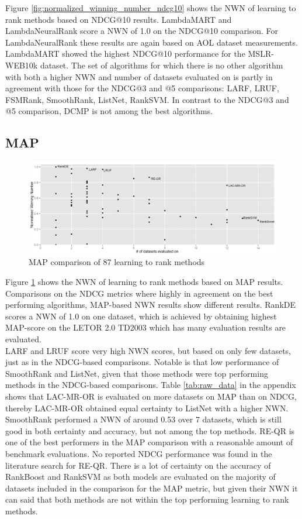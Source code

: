 \documentclass[english, authoryear, preprint]{elsarticle}
\begin{document}
Figure \ref{fig:normalized_winning_number_ndcg10} shows the NWN of learning to rank methods based on NDCG@10 results. LambdaMART and LambdaNeuralRank score a NWN of 1.0 on the NDCG@10 comparison. For LambdaNeuralRank these results are again based on AOL dataset measurements. LambdaMART showed the highest NDCG@10 performance for the MSLR-WEB10k dataset. The set of algorithms for which there is no other algorithm with both a higher NWN and number of datasets evaluated on is partly in agreement with those for the NDCG@3 and @5 comparisons: {LARF, LRUF, FSMRank, SmoothRank, ListNet, RankSVM}. In contrast to the NDCG@3 and @5 comparison, DCMP is not among the best algorithms.

\subsection{MAP}
\begin{figure}
\centering
\includegraphics[scale=0.26]{gfx/map_winnum}
\caption{MAP comparison of 87 learning to rank methods}
\label{fig:normalized_winning_number_map}
\end{figure}
Figure \ref{fig:normalized_winning_number_map} shows the NWN of learning to rank methods based on MAP results. Comparisons on the NDCG metrics where highly in agreement on the best performing algorithms, MAP-based NWN results show different results. RankDE scores a NWN of 1.0 on one dataset, which is achieved by obtaining highest MAP-score on the LETOR 2.0 TD2003 which has many evaluation results are evaluated.\\

LARF and LRUF score very high NWN scores, but based on only few datasets, just as in the NDCG-based comparisons. Notable is that low performance of SmoothRank and ListNet, given that those methods were top performing methods in the NDCG-based comparisons. Table \ref{tab:raw_data} in the appendix shows that LAC-MR-OR is evaluated on more datasets on MAP than on NDCG, thereby LAC-MR-OR obtained equal certainty to ListNet with a higher NWN. SmoothRank performed a NWN of around 0.53 over 7 datasets, which is still good in both certainty and accuracy, but not among the top methods. RE-QR is one of the best performers in the MAP comparison with a reasonable amount of benchmark evaluations. No reported NDCG performance was found in the literature search for RE-QR. There is a lot of certainty on the accuracy of RankBoost and RankSVM as both models are evaluated on the majority of datasets included in the comparison for the MAP metric, but given their NWN it can said that both methods are not within the top performing learning to rank methods.
\end{document}
